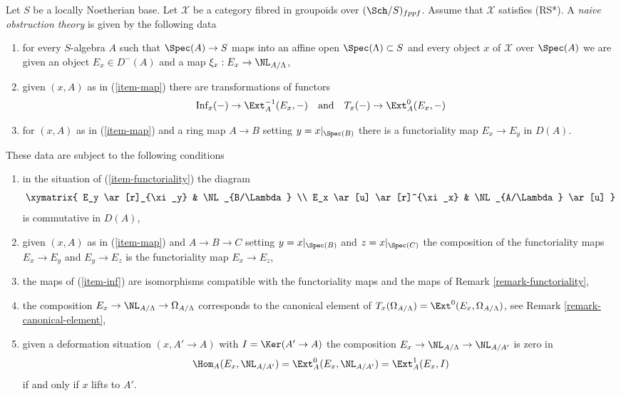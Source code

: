\begin{definition}
\label{definition-naive-obstruction-theory}
Let $S$ be a locally Noetherian base. Let $\mathcal{X}$ be a category fibred
in groupoids over $(\Sch/S)_{fppf}$. Assume that $\mathcal{X}$
satisfies (RS*). A {\it naive obstruction theory} is 
given by the following data
\begin{enumerate}
\item
\label{item-map}
for every $S$-algebra $A$ such that $\Spec(A) \to S$
maps into an affine open $\Spec(\Lambda) \subset S$ and every object $x$
of $\mathcal{X}$ over $\Spec(A)$ we are given an object $E_x \in D^-(A)$
and a map $\xi_x : E_x \to \NL_{A/\Lambda}$,
\item
\label{item-inf}
given $(x, A)$ as in (\ref{item-map}) there are transformations of
functors
$$
\text{Inf}_x( - ) \to \Ext^{-1}_A(E_x, -)
\quad\text{and}\quad
T_x(-) \to \Ext^0_A(E_x, -)
$$
\item
\label{item-functoriality}
for $(x, A)$ as in (\ref{item-map}) and a ring map $A \to B$
setting $y = x|_{\Spec(B)}$ there is a functoriality map
$E_x \to E_y$ in $D(A)$.
\end{enumerate}
These data are subject to the following conditions
\begin{enumerate}
\item[(i)]
in the situation of (\ref{item-functoriality}) the diagram
$$
\xymatrix{
E_y \ar[r]_{\xi_y} & \NL_{B/\Lambda} \\
E_x \ar[u] \ar[r]^{\xi_x} & \NL_{A/\Lambda} \ar[u]
}
$$
is commutative in $D(A)$,
\item[(ii)]
given $(x, A)$ as in (\ref{item-map}) and $A \to B \to C$
setting $y = x|_{\Spec(B)}$ and $z = x|_{\Spec(C)}$ the
composition of the functoriality maps $E_x \to E_y$ and $E_y \to E_z$ is
the functoriality map $E_x \to E_z$,
\item[(iii)]
the maps of (\ref{item-inf}) are isomorphisms
compatible with the functoriality
maps and the maps of Remark \ref{remark-functoriality},
\item[(iv)]
the composition $E_x \to \NL_{A/\Lambda} \to \Omega_{A/\Lambda}$
corresponds to the canonical element of
$T_x(\Omega_{A/\Lambda}) = \Ext^0(E_x, \Omega_{A/\Lambda})$, see
Remark \ref{remark-canonical-element},
\item[(v)]
given a deformation situation $(x, A' \to A)$ with $I = \Ker(A' \to A)$
the composition $E_x \to \NL_{A/\Lambda} \to \NL_{A/A'}$ is zero in
$$
\Hom_A(E_x, \NL_{A/A'}) = \Ext^0_A(E_x, \NL_{A/A'}) =
\Ext^1_A(E_x, I)
$$
if and only if $x$ lifts to $A'$.
\end{enumerate}
\end{definition}

